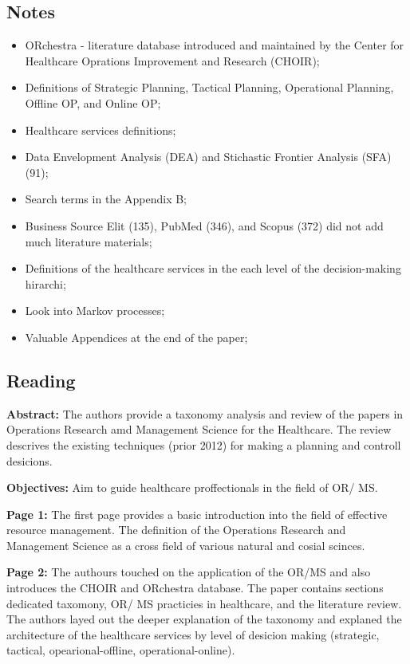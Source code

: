 \subsection{Notes}
    \begin{itemize}
        \item ORchestra - literature database introduced and maintained by the Center for Healthcare Oprations Improvement and Research (CHOIR);
        \item Definitions of Strategic Planning, Tactical Planning, Operational Planning, Offline OP, and Online OP;
        \item Healthcare services definitions;
        \item Data Envelopment Analysis (DEA) and Stichastic Frontier Analysis (SFA) (91);
        \item Search terms in the Appendix B;
        \item Business Source Elit (135), PubMed (346), and Scopus (372) did not add much literature materials;
        \item Definitions of the healthcare services in the each level of the decision-making hirarchi;
        \item Look into Markov processes;
        \item Valuable Appendices at the end of the paper; 
    \end{itemize}


\subsection{Reading}
    \textbf{Abstract:}
    The authors provide a taxonomy analysis and review of the papers in Operations Research amd Management Science for the Healthcare. The review descrives the existing techniques (prior 2012) for making a planning and controll desicions.
    
    \textbf{Objectives:}
    Aim to guide healthcare proffectionals in the field of OR/ MS.

    
    \textbf{Page 1:}
    The first page provides a basic introduction into the field of effective resource management. The definition of the Operations Research and Management Science as a cross field of various natural and cosial scinces. 
    
    \textbf{Page 2:}
    The authours touched on the application of the OR/MS and also introduces the CHOIR and ORchestra database. The paper contains sections dedicated taxomony, OR/ MS practicies in healthcare, and the literature review. The authors layed out the deeper explanation of the taxonomy and explaned the architecture of the healthcare services by level of desicion making (strategic, tactical, opearional-offline, operational-online).
    

